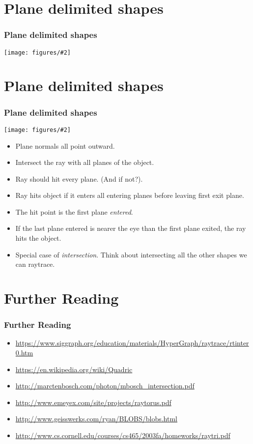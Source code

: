 \documentclass[slidestop,xcolor=pst]{beamer}
\newcommand{\mygraph}[2]{\texttt{[image: figures/\#2]}}
\newcommand{\mygraphc}[2]{\centerline{\texttt{[image: figures/\#2]}}}
\newcommand{\sect}[1]{
\section{#1}
\begin{frame}[fragile]\frametitle{#1}
}
\newcommand{\bi}{\begin{itemize}}
\newcommand{\ei}{\end{itemize}}
\begin{document}
\sect{Plane delimited shapes}
\mygraphc{0.6}{planedelimited.png}
\end{frame}

\sect{Plane delimited shapes}
\mygraph{0.3}{planedelimited.png}
\begin{minipage}{3in}
  \bi
\item Plane normals all point outward.
\item Intersect the ray with all planes of the object.
\item Ray should hit every plane.  (And if not?).
  \item Ray hits object if it enters all entering planes before
    leaving first exit plane.
\item The hit point is the first plane {\em entered}.
\item If the last plane entered is nearer the eye than the first plane
  exited, the ray hits the object. 
\item Special case of {\em intersection}.  Think about intersecting
  all the other shapes we can raytrace.
 \ei
\end{minipage}
\end{frame}



\sect{Further Reading}
\begin{itemize}
\item
\url{https://www.siggraph.org/education/materials/HyperGraph/raytrace/rtinter0.htm}
\item \url{https://en.wikipedia.org/wiki/Quadric}
\item \url{http://marctenbosch.com/photon/mbosch_intersection.pdf}
\item\url{http://www.emeyex.com/site/projects/raytorus.pdf}
\item
\url{http://www.geisswerks.com/ryan/BLOBS/blobs.html}
\item 
 \url{http://www.cs.cornell.edu/courses/cs465/2003fa/homeworks/raytri.pdf}
\end{itemize}
\end{frame}
\end{document}
